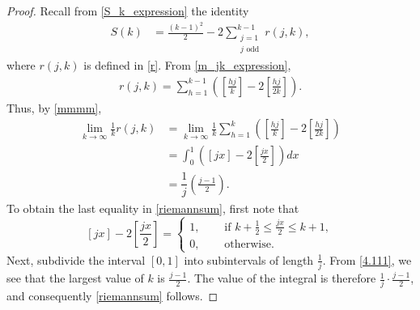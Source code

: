 \documentclass[11pt,reqno]{amsart}
\newcommand{\df}{\dfrac}
\theoremstyle{plain}
\numberwithin{equation}{section}
\begin{document}
\begin{proof} Recall from \eqref{S_k_expression} the identity
\begin{align}\label{4.22}
	S(k)
	&=\frac{(k-1)^2}{2}-2\sum_{\substack{j=1\\j \text{ odd}}}^{k-1}r(j,k),
\end{align}
where  $r(j,k)$ is defined in \eqref{r}. From \eqref{m_jk_expression},
    \begin{align}\label{mmmm}
r(j,k)= \sum_{h=1}^{k-1} \left(\left[\frac{hj}{k}\right]-2\left[\frac{hj}{2k}\right]\right).
\end{align}
Thus, by \eqref{mmmm},
\begin{align}
 \lim_{k\to\infty}\frac{1}{k} r(j,k)&=\lim_{k\to\infty} \frac{1}{k}\sum_{h=1}^{k} \left(\left[\frac{hj}{k}\right]-2\left[\frac{hj}{2k}\right]\right)\nonumber\\
    &=\int _0^1\left(\left[ jx\right]-2\left[\frac{jx}{2}\right]\right)dx\nonumber\\
    &=\df{1}{j}\left(\frac{j-1}{2}\right).\label{riemannsum}
\end{align}
To obtain the last equality in \eqref{riemannsum}, first note that
\begin{equation}\label{4.111}
\left[ jx\right]-2\left[\frac{jx}{2}\right]
=\begin{cases} 1,\quad &\text{ if } k+\frac{1}{2} \leq \frac{jx}{2} \leq k+1,  \\
0,&\text{ otherwise}.
\end{cases}
\end{equation}
 Next, subdivide the interval $[0,1] $ into subintervals of length $\frac{1}{j}$. From \eqref{4.111}, we see that the largest value of $k$ is $\frac{j-1}{2}$. The value of the integral is therefore $\frac{1}{j}\cdot\frac{j-1}{2}$, and consequently \eqref{riemannsum} follows.


\end{proof}
\end{document}

